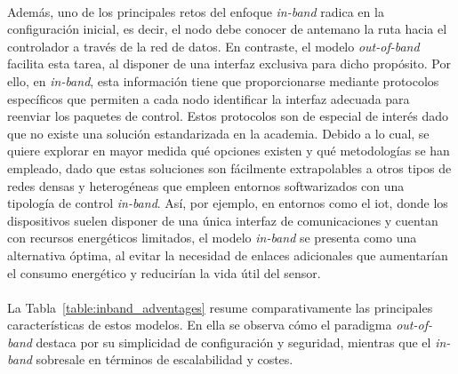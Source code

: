 \\
Además, uno de los principales retos del enfoque \textit{in-band} radica en la configuración inicial, es decir, el nodo debe conocer de antemano la ruta hacia el controlador a través de la red de datos. En contraste, el modelo \textit{out-of-band} facilita esta tarea, al disponer de una interfaz exclusiva para dicho propósito. Por ello, en \textit{in-band}, esta información tiene que proporcionarse mediante protocolos específicos que permiten a cada nodo identificar la interfaz adecuada para reenviar los paquetes de control. Estos protocolos son de especial de interés dado que no existe una solución estandarizada en la academia. Debido a lo cual, se quiere explorar en mayor medida qué opciones existen y qué metodologías se han empleado, dado que estas soluciones son fácilmente extrapolables a otros tipos de redes densas y heterogéneas que empleen entornos softwarizados con una tipología de control \textit{in-band}. Así, por ejemplo, en entornos como el \gls{iot}, donde los dispositivos suelen disponer de una única interfaz de comunicaciones y cuentan con recursos energéticos limitados, el modelo \textit{in-band} se presenta como una alternativa óptima, al evitar la necesidad de enlaces adicionales que aumentarían el consumo energético y reducirían la vida útil del sensor. \\
\\
La Tabla~\ref{table:inband_adventages} resume comparativamente las principales características de estos modelos. En ella se observa cómo el paradigma \textit{out-of-band} destaca por su simplicidad de configuración y seguridad, mientras que el \textit{in-band} sobresale en términos de escalabilidad y costes. 

\begin{table}[ht]
\centering
{}
\caption{Características del control \textit{in-band} y \textit{out-of-band}.}
\label{table:inband_adventages}
\end{table}


